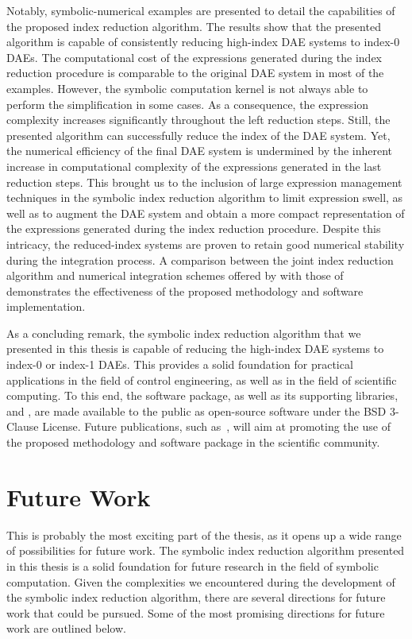 Notably, symbolic-numerical examples are presented to detail the capabilities of the proposed index reduction algorithm. The results show that the presented algorithm is capable of consistently reducing high-index \ac{DAE} systems to index-0 \acp{DAE}. The computational cost of the expressions generated during the index reduction procedure is comparable to the original \ac{DAE} system in most of the examples. However, the \Maple{} symbolic computation kernel is not always able to perform the simplification in some cases. As a consequence, the expression complexity increases significantly throughout the left reduction steps. Still, the presented algorithm can successfully reduce the index of the \ac{DAE} system. Yet, the numerical efficiency of the final \ac{DAE} system is undermined by the inherent increase in computational complexity of the expressions generated in the last reduction steps. This brought us to the inclusion of large expression management techniques in the symbolic index reduction algorithm to limit expression swell, as well as to augment the \ac{DAE} system and obtain a more compact representation of the expressions generated during the index reduction procedure. Despite this intricacy, the reduced-index systems are proven to retain good numerical stability during the integration process. A comparison between the joint index reduction algorithm and numerical integration schemes offered by \Maple{} with those of \Indigo{} demonstrates the effectiveness of the proposed methodology and software implementation.

As a concluding remark, the symbolic index reduction algorithm that we presented in this thesis is capable of reducing the high-index \ac{DAE} systems to index-0 or index-1 \acp{DAE}. This provides a solid foundation for practical applications in the field of control engineering, as well as in the field of scientific computing. To this end, the \Indigo{} software package, as well as its supporting libraries, \LEM{} and \LAST{}, are made available to the public as open-source software under the BSD 3-Clause License. Future publications, such as~\cite{stocco2024imece_solution}, will aim at promoting the use of the proposed methodology and software package in the scientific community.

\section{Future Work}

This is probably the most exciting part of the thesis, as it opens up a wide range of possibilities for future work. The symbolic index reduction algorithm presented in this thesis is a solid foundation for future research in the field of symbolic computation. Given the complexities we encountered during the development of the symbolic index reduction algorithm, there are several directions for future work that could be pursued. Some of the most promising directions for future work are outlined below.

